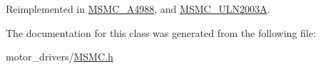 Reimplemented in \hyperlink{class_m_s_m_c___a4988_a409bea28b42827c8bd7d5e5e318af21d}{M\+S\+M\+C\+\_\+\+A4988}, and \hyperlink{class_m_s_m_c___u_l_n2003_a_acdf6b6224352a90146e67ee9837d0a6f}{M\+S\+M\+C\+\_\+\+U\+L\+N2003\+A}.



The documentation for this class was generated from the following file\+:\begin{DoxyCompactItemize}
\item 
motor\+\_\+drivers/\hyperlink{_m_s_m_c_8h}{M\+S\+M\+C.\+h}\end{DoxyCompactItemize}
